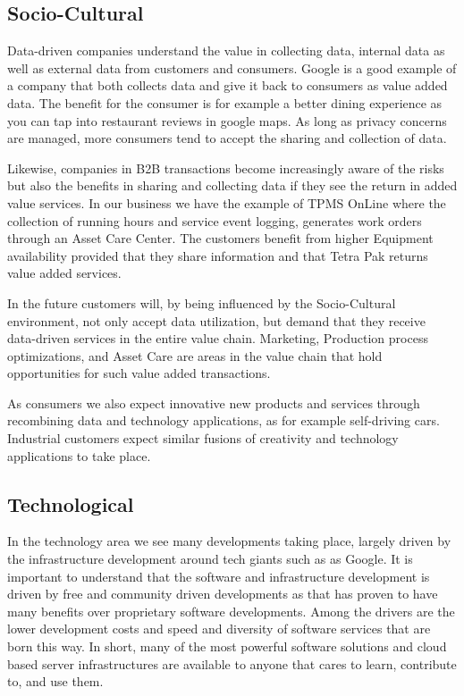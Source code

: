 \documentclass[10pt]{article} %
\begin{document}
\subsection{Socio-Cultural}
Data-driven companies understand the value in collecting data, internal data as well as external data from customers and consumers. Google is a good example of a company that both collects data and give it back to consumers as value added data. The benefit for the consumer is for example a better dining experience as you can tap into restaurant reviews in google maps. As long as privacy concerns are managed, more consumers tend to accept the sharing and collection of data.

Likewise, companies in B2B transactions become increasingly aware of the risks but also the benefits in sharing and collecting data if they see the return in added value services. In our business we have the example of TPMS OnLine where the collection of running hours and service event logging, generates work orders through an Asset Care Center. The customers benefit from higher Equipment availability provided that they share information and that Tetra Pak returns value added services. 

In the future customers will, by being influenced by the Socio-Cultural environment, not only accept data utilization, but demand that they receive data-driven services in the entire value chain. Marketing, Production process optimizations, and Asset Care are areas in the value chain that hold opportunities for such value added transactions.

As consumers we also expect innovative new products and services through recombining data and technology applications, as for example self-driving cars. Industrial customers expect similar fusions of creativity and technology applications to take place.

\subsection{Technological}
In the technology area we see many developments taking place, largely driven by the infrastructure development around tech giants such as as Google. It is important to understand that the software and infrastructure development is driven by free and community driven developments as that has proven to have many benefits over proprietary software developments. Among the drivers are the lower development costs and speed and diversity of software services that are born this way. In short, many of the most powerful software solutions and cloud based server infrastructures are available to anyone that cares to learn, contribute to, and use them.
\end{document}
